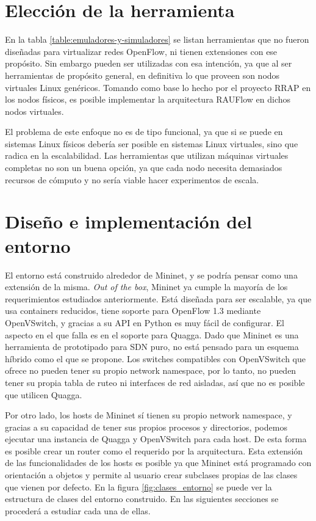 \section{Elección de la herramienta}
En la tabla \ref{table:emuladores-y-simuladores} se listan herramientas que no fueron diseñadas para virtualizar redes OpenFlow, ni tienen extensiones con ese propósito. Sin embargo pueden ser utilizadas con esa intención, ya que al ser herramientas de propósito general, en definitiva lo que proveen son nodos virtuales Linux genéricos. Tomando como base lo hecho por el proyecto RRAP en los nodos físicos, es posible implementar la arquitectura RAUFlow en dichos nodos virtuales.

El problema de este enfoque no es de tipo funcional, ya que si se puede en sistemas Linux físicos debería ser posible en sistemas Linux virtuales, sino que radica en la escalabilidad. Las herramientas que utilizan máquinas virtuales completas no son un buena opción, ya que cada nodo necesita demasiados recursos de cómputo y no sería viable hacer experimentos de escala.


\section{Diseño e implementación del entorno}
El entorno está construido alrededor de Mininet, y se podría pensar como una extensión de la misma. \textit{Out of the box}, Mininet ya cumple la mayoría de los requerimientos estudiados anteriormente. Está diseñada para ser escalable, ya que usa containers reducidos, tiene soporte para OpenFlow 1.3 mediante OpenVSwitch, y gracias a su API en Python es muy fácil de configurar. El aspecto en el que falla es en el soporte para Quagga. Dado que Mininet es una herramienta de prototipado para SDN puro, no está pensado para un esquema híbrido como el que se propone. Los switches compatibles con OpenVSwitch que ofrece no pueden tener su propio network namespace, por lo tanto, no pueden tener su propia tabla de ruteo ni interfaces de red aisladas, así que no es posible que utilicen Quagga.

Por otro lado, los hosts de Mininet sí tienen su propio network namespace, y gracias a su capacidad de tener sus propios procesos y directorios, podemos ejecutar una instancia de Quagga y OpenVSwitch para cada host. De esta forma es posible crear un router como el requerido por la arquitectura. Esta extensión de las funcionalidades de los hosts es posible ya que Mininet está programado con orientación a objetos y permite al usuario crear subclases propias de las clases que vienen por defecto. En la figura \ref{fig:clases_entorno} se puede ver la estructura de clases del entorno construido. En las siguientes secciones se procederá a estudiar cada una de ellas.

